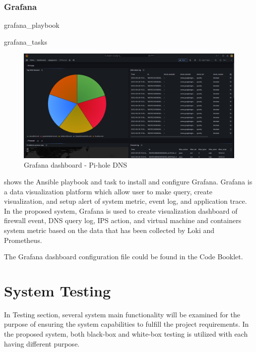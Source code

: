 \documentclass[../index.tex]{subfiles}
\begin{document}
\subsubsection{Grafana}

{grafana_playbook}

{grafana_tasks}

\begin{figure}[h]
  \includegraphics[width=\textwidth]{../assets/grafana_pihole.png}
  \caption{Grafana dashboard - Pi-hole DNS}
  \label{fig:grafana_pihole}
\end{figure}

 shows the Ansible playbook and task to install and
configure Grafana. Grafana is a data visualization platform which allow user to make query, create
visualization, and setup alert of system metric, event log, and application trace. In the proposed
system, Grafana is used to create visualization dashboard of firewall event, DNS query log, IPS
action, and virtual machine and containers system metric based on the data that has been collected
by Loki and Prometheus.

The Grafana dashboard configuration file could be found in the Code Booklet.

\section{System Testing}

In Testing section, several system main functionality will be examined for the purpose of ensuring
the system capabilities to fulfill the project requirements. In the proposed system, both black-box
and white-box testing is utilized with each having different purpose.
\end{document}
